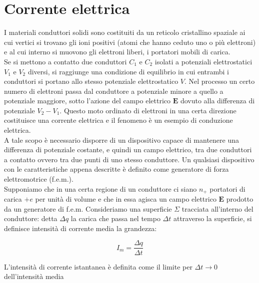 \restoregeometry

\chapter{Corrente elettrica}

I materiali conduttori solidi sono costituiti da un reticolo cristallino spaziale ai cui vertici si trovano gli ioni positivi (atomi che hanno ceduto uno o più elettroni) e al cui interno si muovono gli elettroni liberi, i portatori mobili di carica. \\ 

Se si mettono a contatto due conduttori $C_1$ e $C_2$ isolati a potenziali elettrostatici $V_1$ e $V_2$ diversi, si raggiunge una condizione di equilibrio in cui entrambi i conduttori si portano allo stesso potenziale elettrostatico $V$. Nel processo un certo numero di elettroni passa dal conduttore a potenziale minore a quello a potenziale maggiore, sotto l'azione del campo elettrico $\mathbf{E}$ dovuto alla differenza di potenziale $V_2 - V_1$. Questo moto  ordinato di elettroni in una certa direzione costituisce una corrente elettrica e il fenomeno è un esempio di conduzione elettrica.\\

A tale scopo è necessario disporre di un dispositivo capace di mantenere una differenza di potenziale costante, e quindi un campo elettrico, tra due conduttori a contatto ovvero tra due punti di uno stesso conduttore. Un qualsiasi dispositivo con le caratteristiche appena descritte è definito come generatore di forza elettromotrice (f.e.m.). \\

Supponiamo che in una certa regione di un conduttore ci siano $n_+$ portatori di carica $+e$ per unità di volume e che in essa agisca un campo elettrico $\mathbf{E}$ prodotto da un generatore di f.e.m. Consideriamo una superficie $\Sigma$ tracciata all'interno del conduttore: detta $\Delta q$ la carica che passa nel tempo $\Delta t$ attraverso la superficie, si definisce intensità di corrente media la grandezza:

\begin{equation}
    I_m = \frac{\Delta q}{\Delta t}
\end{equation}

L'intensità di corrente istantanea  è definita come il limite per $\Delta t \to 0$ dell'intensità media

